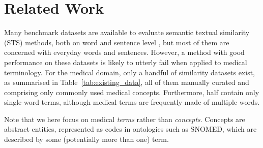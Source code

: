\documentclass[letterpaper]{article} %
\begin{document}
\section{Related Work}

Many benchmark datasets are available to evaluate semantic textual similarity (STS) methods, both on word and sentence level \cite{ZhelezniakEtAl2019-correlation}, but
most of them are concerned with everyday words and sentences.
However, a method with good performance on these datasets is likely to utterly fail when applied to medical terminology.
For the medical domain, only a handful of similarity datasets exist, as summarised in Table~\ref{tab:existing_data}, all of them manually curated and comprising only commonly used medical concepts.
Furthermore, half contain only single-word terms, although medical terms are frequently made of multiple words.

Note that we here focus on medical \emph{terms} rather than \emph{concepts}. Concepts are abstract entities, represented as codes in ontologies such as SNOMED, which are described by some (potentially more than one) term.
\end{document}
